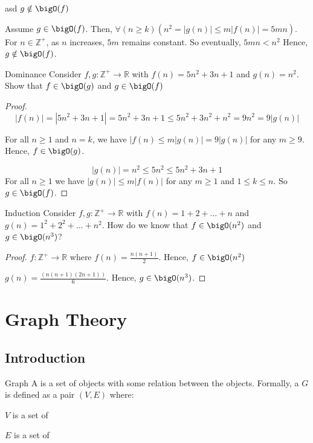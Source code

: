 \documentclass[12pt]{report}
\begin{document}
\begin{thmbox}{asd}
	$g \notin \bigO(f)$

	Assume $g \in \bigO(f)$. Then, $\forall (n \geq k) (n^2 = |g(n)| \leq m|f(n)| = 5mn)$. For $n \in \mathbb{Z}^+$, as $n$ increases, $5m$ remains constant. So eventually, $5mn < n^2$ Hence, $g \notin \bigO(f)$.
\end{thmbox}

\begin{exbox}{Dominance}
	Consider $f,g : \mathbb{Z}^+ \rightarrow \mathbb{R}$ with $f(n) = 5n^2 + 3n + 1$ and $g(n) = n^2$. Show that $f \in \bigO(g)$ and $g \in \bigO(f)$
	\tcblower
	\begin{proof}
		$$|f(n)| = |5n^2 + 3n + 1| = 5n^2 + 3n + 1 \leq 5n^2 + 3n^2 + n^2 = 9n^2 = 9|g(n)|$$

		For all $n \geq 1$ and $n = k$, we have $|f(n) \leq m |g(n)| = 9|g(n)|$ for any $m \geq 9$. Hence, $f \in \bigO(g)$.

		$$|g(n)| = n^2 \leq 5n^2 \leq 5n^2 + 3n +1$$
		For all $n \geq 1$ we have $|g(n)| \leq m |f(n) |$ for any $m \geq 1$ and $1 \leq k \leq n$. So $g \in \bigO(f)$.
	\end{proof}
\end{exbox}

\begin{exbox}{Induction}
	Consider $f,g : \mathbb{Z}^+ \rightarrow \mathbb{R}$ with $f(n) = 1+2+\ldots+n$ and $g(n) = 1^2 + 2^2 + \ldots + n^2$. How do we know that $f \in \bigO(n^2)$ and $g \in \bigO(n^3)$?
	\tcblower
	\begin{proof}
		$f: \mathbb{Z}^+ \rightarrow \mathbb{R}$ where $f(n) = \frac{n(n+1)}{2}$. Hence, $f \in \bigO(n^2)$

		$g(n) = \frac{(n(n+1)(2n+1))}{6}$. Hence, $g \in \bigO(n^3)$.
	\end{proof}
\end{exbox}

\newpage
\chapter{Graph Theory}

\section{Introduction}
\begin{dfnbox}{Graph}
	A  is a set of objects with some relation between the objects.
	\tcblower
	Formally, a  $G$ is defined as a pair $(V,E)$ where:
	\begin{dfnitems}
		\item $V$ is a set of 
		\item $E$ is a set of 
	\end{dfnitems}
\end{dfnbox}
\end{document}
